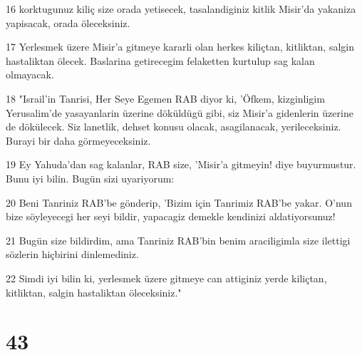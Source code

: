 \par 16 korktugunuz kiliç size orada yetisecek, tasalandiginiz kitlik Misir'da yakaniza yapisacak, orada öleceksiniz.
\par 17 Yerlesmek üzere Misir'a gitmeye kararli olan herkes kiliçtan, kitliktan, salgin hastaliktan ölecek. Baslarina getirecegim felaketten kurtulup sag kalan olmayacak.
\par 18 "Israil'in Tanrisi, Her Seye Egemen RAB diyor ki, 'Öfkem, kizginligim Yerusalim'de yasayanlarin üzerine döküldügü gibi, siz Misir'a gidenlerin üzerine de dökülecek. Siz lanetlik, dehset konusu olacak, asagilanacak, yerileceksiniz. Burayi bir daha görmeyeceksiniz.
\par 19 Ey Yahuda'dan sag kalanlar, RAB size, 'Misir'a gitmeyin! diye buyurmustur. Bunu iyi bilin. Bugün sizi uyariyorum:
\par 20 Beni Tanriniz RAB'be gönderip, 'Bizim için Tanrimiz RAB'be yakar. O'nun bize söyleyecegi her seyi bildir, yapacagiz demekle kendinizi aldatiyorsunuz!
\par 21 Bugün size bildirdim, ama Tanriniz RAB'bin benim araciligimla size ilettigi sözlerin hiçbirini dinlemediniz.
\par 22 Simdi iyi bilin ki, yerlesmek üzere gitmeye can attiginiz yerde kiliçtan, kitliktan, salgin hastaliktan öleceksiniz."

\chapter{43}


